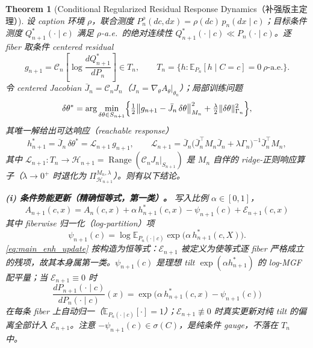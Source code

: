\documentclass[11pt,a4paper]{article}
\newtheorem{theorem}{Theorem}[section]
\newcommand{\E}{\mathbb{E}}
\newcommand{\cL}{\mathcal{L}}
\newcommand{\cH}{\mathcal{H}}
\newcommand{\cE}{\mathcal{E}}
\newcommand{\ProjectOp}{\Pi}
\newcommand{\Range}{\operatorname{Range}}
\newcommand{\Center}{\mathcal{C}}
\begin{document}
\begin{theorem}[Conditional Regularized Residual Response Dynamics（补强版主定理）]\label{thm:main_enhanced}
设 caption 环境 $\rho$，联合测度 $P_n^\rho(dc,dx)=\rho(dc)\,p_n(dx\mid c)$；目标条件测度 $Q^*_{n+1}(\cdot\mid c)$ 满足 $\rho$-a.e.\ 的绝对连续性 $Q^*_{n+1}(\cdot\mid c)\ll P_n(\cdot\mid c)$。逐 fiber 取条件 centered residual
\[
g_{n+1}=\Center_n\!\left[\log\frac{dQ^*_{n+1}}{dP_n}\right]\in T_n,\qquad T_n=\{h:\E_{P_n}[h\mid C=c]=0\ \rho\text{-a.e.}\}.
\]
令 centered Jacobian $\bar J_n=\Center_n J_n$（$J_n=\nabla_\theta A_\theta|_{\theta_n}$）；局部训练问题
\begin{equation*}
\delta\theta^*=\arg\min_{\delta\theta\in S_{n+1}}\Bigl\{\tfrac12\bigl\|g_{n+1}-\bar J_n\,\delta\theta\bigr\|_{M_n}^2+\tfrac{\lambda}{2}\|\delta\theta\|_{\Gamma_n}^2\Bigr\},
\end{equation*}
其唯一解给出可达响应（reachable response）
\begin{equation*}
h^*_{n+1}=\bar J_n\,\delta\theta^*=\cL_{n+1}\,g_{n+1},\qquad
\cL_{n+1}=\bar J_n\bigl(\bar J_n^{\top}M_n\bar J_n+\lambda\Gamma_n\bigr)^{-1}\bar J_n^{\top}M_n,
\end{equation*}
其中 $\cL_{n+1}:T_n\to\cH_{n+1}=\Range(\Center_n J_n|_{S_{n+1}})$ 是 $M_n$ 自伴的 ridge-正则响应算子（$\lambda\to0^+$ 时退化为 $\ProjectOp^{M_n,\lambda}_{\cH_{n+1}}$）。则有以下结论。

\medskip
\noindent\textbf{(i) 条件势能更新（精确恒等式，第一类）。} 写入比例 $\alpha\in[0,1]$，
\begin{equation}\label{eq:main_enh_update}
\boxed{\,A_{n+1}(c,x)=A_n(c,x)+\alpha\,h^*_{n+1}(c,x)-\psi_{n+1}(c)+\cE_{n+1}(c,x)\,}
\end{equation}
其中 fiberwise 归一化（log-partition）项
\begin{equation}\label{eq:main_enh_psi}
\psi_{n+1}(c)=\log\E_{P_n(\cdot\mid c)}\exp\!\bigl(\alpha\,h^*_{n+1}(c,X)\bigr).
\end{equation}
\eqref{eq:main_enh_update} 按构造为恒等式：$\cE_{n+1}$ 被\emph{定义}为使等式逐 fiber 严格成立的残项，故其本身属第一类。$\psi_{n+1}(c)$ 是理想 tilt $\exp(\alpha h^*_{n+1})$ 的 log-MGF 配平量；当 $\cE_{n+1}\equiv0$ 时
\[
\frac{dP_{n+1}(\cdot\mid c)}{dP_n(\cdot\mid c)}(x)=\exp\!\bigl(\alpha\,h^*_{n+1}(c,x)-\psi_{n+1}(c)\bigr)
\]
在每条 fiber 上自动归一（$\E_{P_n(\cdot\mid c)}[\cdot]=1$）；$\cE_{n+1}\not\equiv0$ 时真实更新对纯 tilt 的偏离全部计入 $\cE_{n+1}$。注意 $-\psi_{n+1}(c)\in\sigma(C)$，是纯条件 gauge，不落在 $T_n$ 中。


\end{theorem}
\end{document}
